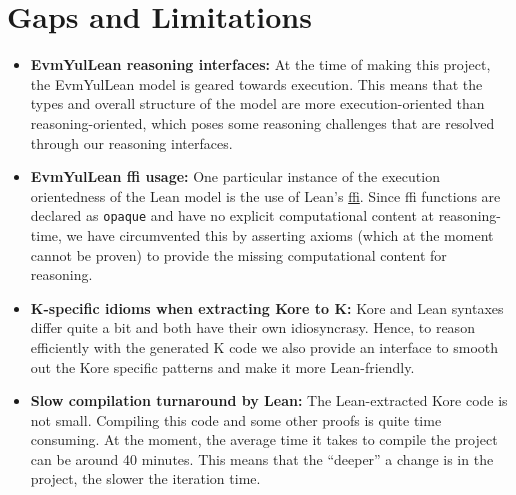 \section{Gaps and Limitations}

\begin{itemize}
\item \textbf{EvmYulLean reasoning interfaces:} At the time of making this project, the EvmYulLean model is geared towards execution. This means that the types and overall structure of the model are more execution-oriented than reasoning-oriented, which poses some reasoning challenges that are resolved through our reasoning interfaces.
\item \textbf{EvmYulLean ffi usage:} One particular instance of the execution orientedness of the Lean model is the use of Lean's \href{https://en.wikipedia.org/wiki/Foreign_function_interface}{ffi}. Since ffi functions are declared as \texttt{opaque} and have no explicit computational content at reasoning-time, we have circumvented this by asserting axioms (which at the moment cannot be proven) to provide the missing computational content for reasoning.
\item \textbf{K-specific idioms when extracting Kore to K:} Kore and Lean syntaxes differ quite a bit and both have their own idiosyncrasy. Hence, to reason efficiently with the generated K code we also provide an interface to smooth out the Kore specific patterns and make it more Lean-friendly.
\item \textbf{Slow compilation turnaround by Lean:} The Lean-extracted Kore code is not small. Compiling this code and some other proofs is quite time consuming. At the moment, the average time it takes to compile the project can be around 40 minutes. This means that the ``deeper'' a change is in the project, the slower the iteration time.
\end{itemize}


%







%



